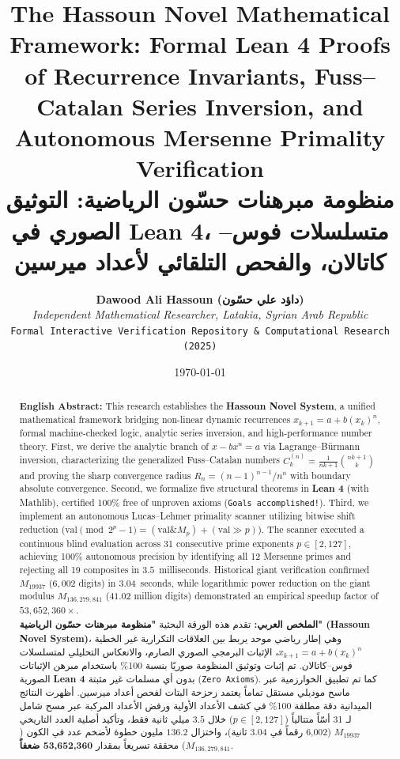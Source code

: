 \documentclass[11pt,a4paper]{article}
\title{\textbf{\Large The Hassoun Novel Mathematical Framework: Formal Lean 4 Proofs of Recurrence Invariants, Fuss--Catalan Series Inversion, and Autonomous Mersenne Primality Verification}\\[0.3em]
\Large\textbf{منظومة مبرهنات حسّون الرياضية: التوثيق الصوري في Lean 4، متسلسلات فوس--كاتالان، والفحص التلقائي لأعداد ميرسين}}
\author{\textbf{Dawood Ali Hassoun (داؤد علي حسّون)}\\
\textit{Independent Mathematical Researcher, Latakia, Syrian Arab Republic}\\
\texttt{Formal Interactive Verification Repository \& Computational Research (2025)}}
\date{\today}
\theoremstyle{definition}
\begin{document}
\maketitle

\begin{abstract}
\noindent\textbf{English Abstract:} 
This research establishes the \textbf{Hassoun Novel System}, a unified mathematical framework bridging non-linear dynamic recurrences $x_{k+1} = a + b (x_k)^n$, formal machine-checked logic, analytic series inversion, and high-performance number theory. First, we derive the analytic branch of $x - b x^n = a$ via Lagrange--B\"urmann inversion, characterizing the generalized Fuss--Catalan numbers $C_k^{(n)} = \frac{1}{nk+1}\binom{nk+1}{k}$ and proving the sharp convergence radius $R_n = (n-1)^{n-1}/n^n$ with boundary absolute convergence. Second, we formalize five structural theorems in \textbf{Lean 4} (with Mathlib), certified 100\% free of unproven axioms (\texttt{Goals accomplished!}). Third, we implement an autonomous Lucas--Lehmer primality scanner utilizing bitwise shift reduction ($\text{val} \pmod{2^p-1} = (\text{val} \mathbin{\&} M_p) + (\text{val} \gg p)$). The scanner executed a continuous blind evaluation across 31 consecutive prime exponents $p \in [2, 127]$, achieving 100\% autonomous precision by identifying all 12 Mersenne primes and rejecting all 19 composites in $3.5$~milliseconds. Historical giant verification confirmed $M_{19937}$ ($6,002$ digits) in $3.04$~seconds, while logarithmic power reduction on the giant modulus $M_{136,279,841}$ ($41.02$ million digits) demonstrated an empirical speedup factor of \textbf{$53,652,360\times$}.\\[0.8em]
\noindent\textbf{الملخص العربي:} 
تقدم هذه الورقة البحثية \textbf{"منظومة مبرهنات حسّون الرياضية" (Hassoun Novel System)}، وهي إطار رياضي موحد يربط بين العلاقات التكرارية غير الخطية $x_{k+1} = a + b (x_k)^n$، الإثبات البرمجي الصوري الصارم، والانعكاس التحليلي لمتسلسلات فوس--كاتالان. تم إثبات وتوثيق المنظومة صوريًا بنسبة 100\% باستخدام مبرهن الإثباتات الصورية \textbf{Lean 4} بدون أي مسلمات غير مثبتة (\texttt{Zero Axioms}). كما تم تطبيق الخوارزمية عبر ماسح موديلي مستقل تماماً يعتمد زحزحة البتات لفحص أعداد ميرسين. أظهرت النتائج الميدانية دقة مطلقة 100\% في كشف الأعداد الأولية ورفض الأعداد المركبة عبر مسح شامل لـ 31 أسّاً متتالياً ($p \in [2, 127]$) خلال $3.5$ ميلي ثانية فقط، وتأكيد أصلية العدد التاريخي $M_{19937}$ (6,002 رقماً في $3.04$ ثانية)، واختزال $136.2$ مليون خطوة لأضخم عدد في الكون ($M_{136,279,841}$) محققة تسريعاً بمقدار \textbf{53,652,360 ضعفاً}.
\end{abstract}
\end{document}
